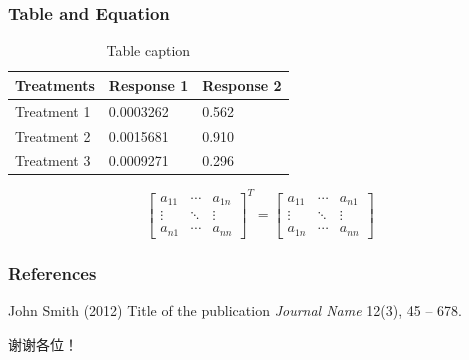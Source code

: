 \documentclass{beamer}
\begin{document}
\begin{frame}
\frametitle{Table and Equation}
\vspace{-0.3cm}
\begin{table}
\begin{tabular}{l l l}
\toprule
\textbf{Treatments} & \textbf{Response 1} & \textbf{Response 2}\\
\midrule
Treatment 1 & 0.0003262 & 0.562 \\
Treatment 2 & 0.0015681 & 0.910 \\
Treatment 3 & 0.0009271 & 0.296 \\
\bottomrule
\end{tabular}
\caption{Table caption}
\end{table}

\begin{equation} %
\label{eq:matrix_transpose}
\left[
\begin{array}{ccc}
a_{11} & \cdots & a_{1n} \\
\vdots & \ddots & \vdots \\
a_{n1} & \cdots & a_{nn}
\end{array}
\right]^T
=
\left[
\begin{array}{ccc}
a_{11} & \cdots & a_{n1} \\
\vdots & \ddots & \vdots \\
a_{1n} & \cdots & a_{nn}
\end{array}
\right]
\end{equation}
\end{frame}


\begin{frame}
\frametitle{References}
\footnotesize{
\begin{thebibliography}{99} %
 John Smith (2012)
\newblock Title of the publication
\newblock \emph{Journal Name} 12(3), 45 -- 678.
\end{thebibliography}
}
\end{frame}

\begin{frame}
谢谢各位！
\end{frame}
\end{document}
